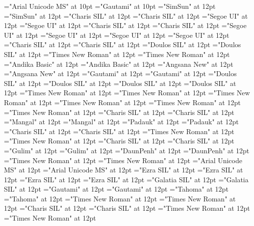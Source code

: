 \documentclass[c5paper,twoside]{article}
\begin{document}
\font\xitemhi="Arial Unicode MS" at 10pt
\font\xitemte="Gautami" at 10pt
\font\spanzhCN="SimSun" at 12pt
\font\divzhCN="SimSun" at 12pt
\font\spanvi="Charis SIL" at 12pt
\font\divvi="Charis SIL" at 12pt
\font\spantsi="Segoe UI" at 12pt
\font\divtsi="Segoe UI" at 12pt
\font\spantsiZxxxxaudio="Charis SIL" at 12pt
\font\divtsiZxxxxaudio="Charis SIL" at 12pt
\font\spantsixstr="Segoe UI" at 12pt
\font\divtsixstr="Segoe UI" at 12pt
\font\spantsifonipa="Segoe UI" at 12pt
\font\divtsifonipa="Segoe UI" at 12pt
\font\spantr="Charis SIL" at 12pt
\font\divtr="Charis SIL" at 12pt
\font\spantrfonipa="Doulos SIL" at 12pt
\font\divtrfonipa="Doulos SIL" at 12pt
\font\spantrfonipaxemic="Times New Roman" at 12pt
\font\divtrfonipaxemic="Times New Roman" at 12pt
\font\spantpi="Andika Basic" at 12pt
\font\divtpi="Andika Basic" at 12pt
\font\spanth="Angsana New" at 12pt
\font\divth="Angsana New" at 12pt
\font\spante="Gautami" at 12pt
\font\divte="Gautami" at 12pt
\font\spanseh="Doulos SIL" at 12pt
\font\divseh="Doulos SIL" at 12pt
\font\spansehfonipaxetic="Doulos SIL" at 12pt
\font\divsehfonipaxetic="Doulos SIL" at 12pt
\font\spanru="Times New Roman" at 12pt
\font\divru="Times New Roman" at 12pt
\font\spanqaaxlel="Times New Roman" at 12pt
\font\divqaaxlel="Times New Roman" at 12pt
\font\spanpt="Times New Roman" at 12pt
\font\divpt="Times New Roman" at 12pt
\font\spannko="Charis SIL" at 12pt
\font\divnko="Charis SIL" at 12pt
\font\spanne="Mangal" at 12pt
\font\divne="Mangal" at 12pt
\font\spanmy="Padauk" at 12pt
\font\divmy="Padauk" at 12pt
\font\spanms="Charis SIL" at 12pt
\font\divms="Charis SIL" at 12pt
\font\spanlv="Times New Roman" at 12pt
\font\divlv="Times New Roman" at 12pt
\font\spankup="Charis SIL" at 12pt
\font\divkup="Charis SIL" at 12pt
\font\spanko="Gulim" at 12pt
\font\divko="Gulim" at 12pt
\font\spankm="DaunPenh" at 12pt
\font\divkm="DaunPenh" at 12pt
\font\spanid="Times New Roman" at 12pt
\font\divid="Times New Roman" at 12pt
\font\spanhi="Arial Unicode MS" at 12pt
\font\divhi="Arial Unicode MS" at 12pt
\font\spanhe="Ezra SIL" at 12pt
\font\divhe="Ezra SIL" at 12pt
\font\spanhbo="Ezra SIL" at 12pt
\font\divhbo="Ezra SIL" at 12pt
\font\spangrc="Galatia SIL" at 12pt
\font\divgrc="Galatia SIL" at 12pt
\font\spanggoTeluIN="Gautami" at 12pt
\font\divggoTeluIN="Gautami" at 12pt
\font\spanggofonipaxemic="Tahoma" at 12pt
\font\divggofonipaxemic="Tahoma" at 12pt
\font\spanfr="Times New Roman" at 12pt
\font\divfr="Times New Roman" at 12pt
\font\spanfrZxxxxaudio="Charis SIL" at 12pt
\font\divfrZxxxxaudio="Charis SIL" at 12pt
\font\spanfa="Times New Roman" at 12pt
\font\divfa="Times New Roman" at 12pt
\end{document}
